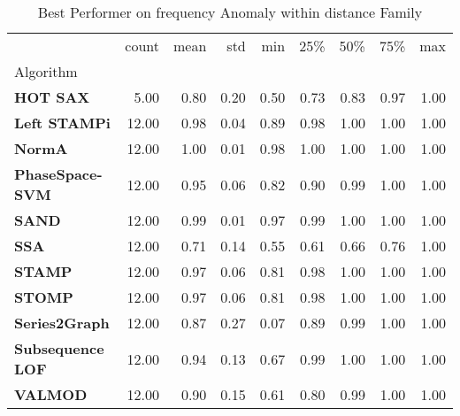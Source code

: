 \begin{table}
\caption{Best Performer on frequency Anomaly within distance Family}
\label{tab:bp-frequency_distance}
\begin{tabular}{lrrrrrrrr}
\toprule
 & count & mean & std & min & 25\% & 50\% & 75\% & max \\
Algorithm &  &  &  &  &  &  &  &  \\
\midrule
\textbf{HOT SAX} & 5.00 & 0.80 & 0.20 & 0.50 & 0.73 & 0.83 & 0.97 & 1.00 \\
\textbf{Left STAMPi} & 12.00 & 0.98 & 0.04 & 0.89 & 0.98 & 1.00 & 1.00 & 1.00 \\
\textbf{NormA} & 12.00 & 1.00 & 0.01 & 0.98 & 1.00 & 1.00 & 1.00 & 1.00 \\
\textbf{PhaseSpace-SVM} & 12.00 & 0.95 & 0.06 & 0.82 & 0.90 & 0.99 & 1.00 & 1.00 \\
\textbf{SAND} & 12.00 & 0.99 & 0.01 & 0.97 & 0.99 & 1.00 & 1.00 & 1.00 \\
\textbf{SSA} & 12.00 & 0.71 & 0.14 & 0.55 & 0.61 & 0.66 & 0.76 & 1.00 \\
\textbf{STAMP} & 12.00 & 0.97 & 0.06 & 0.81 & 0.98 & 1.00 & 1.00 & 1.00 \\
\textbf{STOMP} & 12.00 & 0.97 & 0.06 & 0.81 & 0.98 & 1.00 & 1.00 & 1.00 \\
\textbf{Series2Graph} & 12.00 & 0.87 & 0.27 & 0.07 & 0.89 & 0.99 & 1.00 & 1.00 \\
\textbf{Subsequence LOF} & 12.00 & 0.94 & 0.13 & 0.67 & 0.99 & 1.00 & 1.00 & 1.00 \\
\textbf{VALMOD} & 12.00 & 0.90 & 0.15 & 0.61 & 0.80 & 0.99 & 1.00 & 1.00 \\
\bottomrule
\end{tabular}
\end{table}
